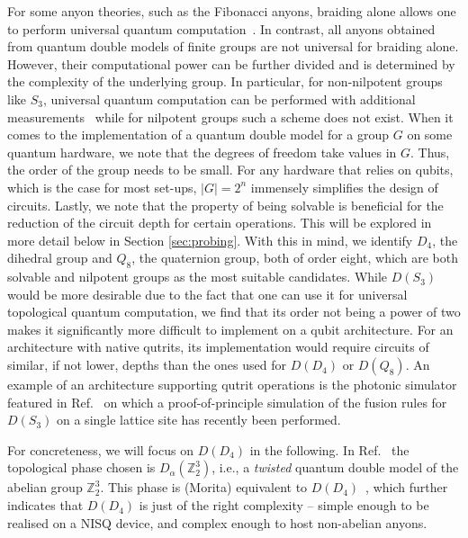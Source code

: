 \documentclass[a4paper,twocolumn,11pt]{quantumarticle}
\begin{document}
For some anyon theories, such as the Fibonacci anyons, braiding alone allows one to perform universal quantum computation~\cite{Freedman2002}. In contrast, all anyons obtained from quantum double models of finite groups are not universal for braiding alone. However, their computational power can be further divided and is determined by the complexity of the underlying group. In particular, for non-nilpotent groups like $S_3$, universal quantum computation can be performed with additional measurements~\cite{Mochon2004} while for nilpotent groups such a scheme does not exist. 
When it comes to the implementation of a quantum double model for a group $G$ on some quantum hardware, we note that the degrees of freedom take values in $G$. Thus, the order of the group needs to be small. For any hardware that relies on qubits, which is the case for most set-ups, $|G|=2^n$ immensely simplifies the design of circuits. Lastly, we note that the property of being solvable is beneficial for the reduction of the circuit depth for certain operations. This will be explored in more detail below in Section \ref{sec:probing}. 
With this in mind, we identify $D_4$, the dihedral group and $Q_8$, the quaternion group, both of order eight, which are both solvable and nilpotent groups as the most suitable candidates.
While $D(S_3)$ would be more desirable due to the fact that one can use it for universal topological quantum computation, we find that its order not being a power of two makes it significantly more difficult to implement on a qubit architecture. For an architecture with native qutrits, its implementation would require circuits of similar, if not lower, depths than the ones used for $D(D_4)$ or $D(Q_8)$. An example of an architecture supporting qutrit operations is the photonic simulator featured in Ref.~\cite{goel2023unveiling} on which a proof-of-principle simulation of the fusion rules for $D(S_3)$ on a single lattice site has recently been performed. 

For concreteness, we will focus on $D(D_4)$ in the following. In Ref.~\cite{iqbal2023creation} the topological phase chosen is $D_\alpha(\mathbb Z_2^3)$, i.e., a \emph{twisted} quantum double model of the abelian group $\mathbb Z_2^3$. This phase is (Morita) equivalent to $D(D_4)$~\cite{mapping, propitius1995topological}, which further indicates that $D(D_4)$ is just of the right complexity -- simple enough to be realised on a NISQ device, and complex enough to host non-abelian anyons.
\end{document}
